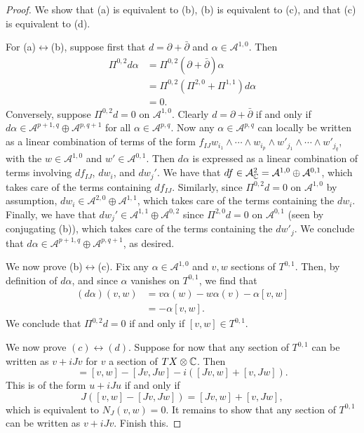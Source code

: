\documentclass{amsart}
\begin{document}
\begin{proof}
    We show that (a) is equivalent to (b), (b) is equivalent to (c), and that (c) is
    equivalent to (d).

    For (a)$\leftrightarrow$(b),
    suppose first that $d=\partial+\bar\partial$ and $\alpha\in\mathcal{A}^{1,0}$.
    Then
    \begin{align*}
        \Pi^{0,2}d\alpha &= \Pi^{0,2}(\partial+\bar\partial)\alpha\\
        &= \Pi^{0,2}(\Pi^{2,0}+\Pi^{1,1})d\alpha\\
        &= 0.
    \end{align*}
    Conversely, suppose $\Pi^{0,2}d=0$ on $\mathcal{A}^{1,0}$. Clearly $d=\partial+\bar\partial$
    if and only if $d\alpha\in\mathcal{A}^{p+1,q}\oplus\mathcal{A}^{p,q+1}$ for
    all $\alpha\in\mathcal{A}^{p,q}$. Now any $\alpha\in\mathcal{A}^{p,q}$ can locally
    be written as a linear combination of terms of the form
    $f_{IJ}w_{i_1}\wedge\cdots\wedge w_{i_p}\wedge w'_{j_1}\wedge\cdots\wedge w'_{j_q}$,
    with the $w\in \mathcal{A}^{1,0}$ and $w'\in\mathcal{A}^{0,1}$. Then $d\alpha$
    is expressed as a linear combination of terms involving $df_{IJ}$, $dw_i$, and $dw_j'$.
    We have that $df\in\mathcal{A}^2_{\mathbb{C}}=\mathcal{A}^{1,0}\oplus\mathcal{A}^{0,1}$,
    which takes care of the terms containing $df_{IJ}$. Similarly, since $\Pi^{0,2}d=0$
    on $\mathcal{A}^{1,0}$ by assumption, $dw_i\in\mathcal{A}^{2,0}\oplus\mathcal{A}^{1,1}$,
    which takes care of the terms containing the $dw_i$. Finally, we have that
    $dw_j'\in\mathcal{A}^{1,1}\oplus\mathcal{A}^{0,2}$ since $\Pi^{2,0}d=0$ on $\mathcal{A}^{0,1}$
    (seen by conjugating (b)), which takes care of the terms containing the $dw'_j$. We
    conclude that $d\alpha\in\mathcal{A}^{p+1,q}\oplus\mathcal{A}^{p,q+1}$, as desired.

    We now prove (b)$\leftrightarrow$(c). Fix any $\alpha\in\mathcal{A}^{1,0}$ and
    $v,w$ sections of $T^{0,1}$. Then, by definition of $d\alpha$, and since $\alpha$
    vanishes on $T^{0,1}$, we find that
    \begin{align*}
        (d\alpha)(v,w) &= v\alpha(w)-w\alpha(v)-\alpha[v,w]\\
        &= -\alpha[v,w].
    \end{align*}
    We conclude that $\Pi^{0,2}d=0$ if and only if $[v,w]\in T^{0,1}$.

    We now prove $(c)\leftrightarrow(d)$. Suppose for now that any section of $T^{0,1}$
    can be written as $v+iJv$ for $v$ a section of $TX\otimes\mathbb{C}$. Then
    \begin{equation*}
        [v+iJv, w+iJw] = [v,w]-[Jv,Jw]-i\left( [Jv,w]+[v,Jw] \right).
    \end{equation*}
    This is of the form $u+iJu$ if and only if
    \begin{equation*}
        J\left( [v,w]-[Jv,Jw] \right)=[Jv,w]+[v,Jw],
    \end{equation*}
    which is equivalent to $N_J(v,w)=0$. It remains to show that any section of
    $T^{0,1}$ can be written as $v+iJv$. Finish this.
\end{proof}
\end{document}

